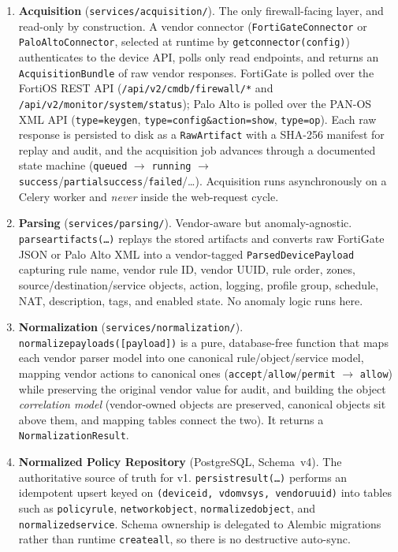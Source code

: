 \documentclass[12pt,a4paper]{report}
\renewcommand{\_}{\textunderscore\allowbreak}
\begin{document}
\begin{enumerate}[leftmargin=2.2em]
  \item \textbf{Acquisition} (\texttt{services/acquisition/}). The only firewall-facing layer, and read-only by construction. A vendor connector (\texttt{FortiGateConnector} or \texttt{PaloAltoConnector}, selected at runtime by \texttt{get\_connector(config)}) authenticates to the device API, polls only read endpoints, and returns an \texttt{AcquisitionBundle} of raw vendor responses. FortiGate is polled over the FortiOS REST API (\texttt{/api/v2/cmdb/firewall/*} and \texttt{/api/v2/monitor/system/status}); Palo Alto is polled over the PAN-OS XML API (\texttt{type=keygen}, \texttt{type=config\&action=show}, \texttt{type=op}). Each raw response is persisted to disk as a \texttt{RawArtifact} with a SHA-256 manifest for replay and audit, and the acquisition job advances through a documented state machine (\texttt{queued} $\rightarrow$ \texttt{running} $\rightarrow$ \texttt{success}/\texttt{partial\_success}/\texttt{failed}/\dots). Acquisition runs asynchronously on a Celery worker and \emph{never} inside the web-request cycle.
  \item \textbf{Parsing} (\texttt{services/parsing/}). Vendor-aware but anomaly-agnostic. \texttt{parse\_artifacts(\dots)} replays the stored artifacts and converts raw FortiGate JSON or Palo Alto XML into a vendor-tagged \texttt{ParsedDevicePayload} capturing rule name, vendor rule ID, vendor UUID, rule order, zones, source/destination/service objects, action, logging, profile group, schedule, NAT, description, tags, and enabled state. No anomaly logic runs here.
  \item \textbf{Normalization} (\texttt{services/normalization/}). \texttt{normalize\_payloads([payload])} is a pure, database-free function that maps each vendor parser model into one canonical rule/object/service model, mapping vendor actions to canonical ones (\texttt{accept}/\texttt{allow}/\texttt{permit} $\rightarrow$ \texttt{allow}) while preserving the original vendor value for audit, and building the object \emph{correlation model} (vendor-owned objects are preserved, canonical objects sit above them, and mapping tables connect the two). It returns a \texttt{NormalizationResult}.
  \item \textbf{Normalized Policy Repository} (PostgreSQL, Schema~v4). The authoritative source of truth for v1. \texttt{persist\_result(\dots)} performs an idempotent upsert keyed on \texttt{(device\_id, vdom\_vsys, vendor\_uuid)} into tables such as \texttt{policy\_rule}, \texttt{network\_object}, \texttt{normalized\_object}, and \texttt{normalized\_service}. Schema ownership is delegated to Alembic migrations rather than runtime \texttt{create\_all}, so there is no destructive auto-sync.

\end{enumerate}
\end{document}
